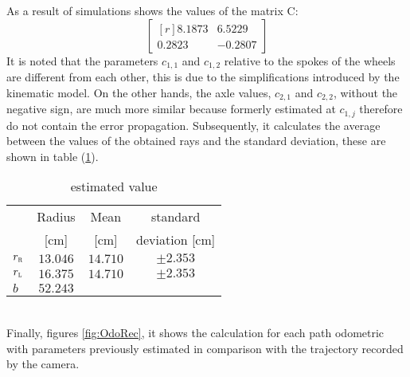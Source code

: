  As a result of simulations shows the values of the matrix C:
\begin{equation}
\label{eq:Cresult}
	\begin{bmatrix*}[r]
		8.1873  &  6.5229\\
    		0.2823  & -0.2807
	\end{bmatrix*}
\end{equation}
It is noted that the parameters $c_{1,1}$ and $c_{1,2}$ relative to the spokes of the wheels are different from each other, this is due to the simplifications introduced by the kinematic model. On the other hands, the axle values, $c_ {2,1}$ and $c_ {2,2}$, without the negative sign, are much more similar because formerly estimated at $c_{1,j}$ therefore do not contain the error propagation. Subsequently, it calculates the average between the values of the obtained rays and the standard deviation, these are shown in table (\ref{tab:recapvalue}).
\begin{table}[!h]
\centering
	\begin{tabular}{lccc}
		\hline
						& 	Radius 		& Mean 		&	standard\\
						&	[cm]			& [cm]		&	deviation [cm]\\
		\hline
		$r_\textsc{r}$	&	$13.046$		& $14.710$	&	$\pm2.353$\\
		$r_\textsc{l}$	&	$16.375$		& $14.710$	&	$\pm2.353$\\
		$b$				&	$52.243$\\
		\hline
\end{tabular}
\caption{estimated value}
\label{tab:recapvalue}
\end{table}
\\Finally, figures \ref{fig:OdoRec}, it shows the calculation for each path odometric with parameters previously estimated in comparison with the trajectory recorded by the camera.
\begin{figure*}[htb]
\centering
{} \,
 \\
 \,
\caption{Odometry reconstruction}
\label{fig:OdoRec}
\end{figure*}

